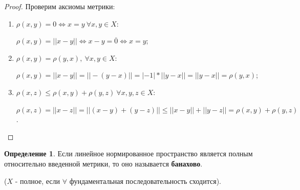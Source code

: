 \documentclass{report}
\theoremstyle{definition}
\newtheorem{definition}{Определение}[section]
\begin{document}
\begin{proof}
  Проверим аксиомы метрики:
  \begin{enumerate}
    \item $\rho(x,y) = 0 \iff x = y \ \forall x,y \in X$:

          $\rho(x,y) = || x-y || \iff x - y = \overline{0} \iff x = y$;

    \item $\rho(x,y) = \rho(y,x), \ \forall x,y \in X$:

          $\rho(x,y) = ||x - y|| = ||-(y-x)|| = |-1| * ||y-x|| = ||y-x|| = \rho(y,x)$;

    \item $\rho(x,z) \leqslant \rho(x,y) + \rho(y,z) \ \forall x,y,z \in X$:

          $\rho(x,z) = ||x-z|| = ||(x-y)+(y-z)|| \leqslant ||x-y|| + ||y-z|| = \rho(x,y) + \rho(y,z)$.
  \end{enumerate}
\end{proof}

\begin{definition}
  Если линейное нормированное пространство является полным относительно введенной метрики, то оно называется
  \textbf{банахово}.

  ($X$ - полное, если $\forall$ фундаментальная последовательность сходится).
\end{definition}
\end{document}
